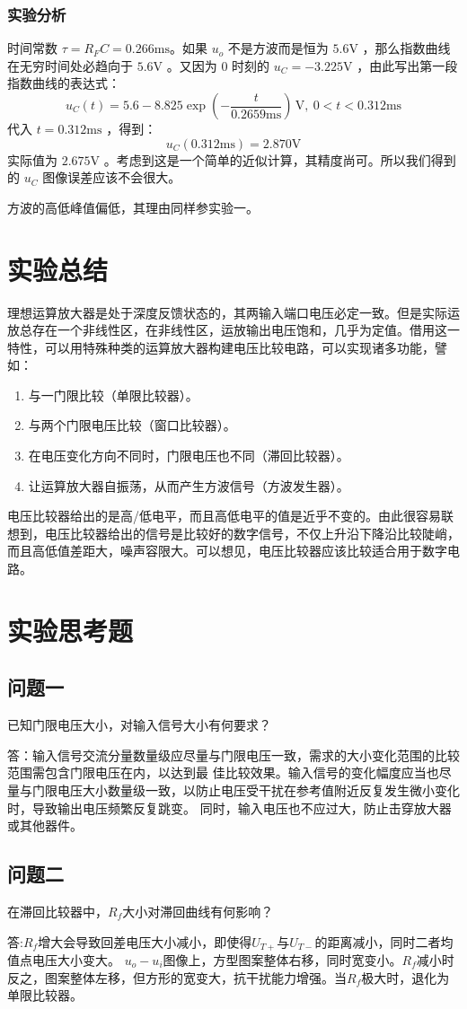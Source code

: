 \documentclass[a4paper,11pt,UTF8]{ctexart}
\newcommand\mr[1]{\mathrm{#1}}
\begin{document}
	\subsubsection{实验分析}
		时间常数 $\tau=R_FC=0.266\mr{ms}$。如果 $u_o$ 不是方波而是恒为 $5.6\mr{V}$ ，那么指数曲线在无穷时间处必趋向于 $5.6\mr{V}$ 。又因为 0 时刻的 $u_C=-3.225\mr{V}$ ，由此写出第一段指数曲线的表达式：
		\[ u_C(t)=5.6-8.825\exp{\left(-\frac{t}{0.2659\mr{ms}}\right)}\,\mr{V},~0<t<0.312\mr{ms} \]
		代入 $t=0.312\mr{ms}$ ，得到：
		\[ u_C(0.312\mr{ms})=2.870\mr{V} \]
		实际值为 $2.675\mr{V}$ 。考虑到这是一个简单的近似计算，其精度尚可。所以我们得到的 $u_C$ 图像误差应该不会很大。
		\par 方波的高低峰值偏低，其理由同样参实验一。
\section{实验总结}
理想运算放大器是处于深度反馈状态的，其两输入端口电压必定一致。但是实际运放总存在一个非线性区，在非线性区，运放输出电压饱和，几乎为定值。借用这一特性，可以用特殊种类的运算放大器构建电压比较电路，可以实现诸多功能，譬如：
\begin{enumerate}
 \item 与一门限比较（单限比较器）。
 \item 与两个门限电压比较（窗口比较器）。
 \item 在电压变化方向不同时，门限电压也不同（滞回比较器）。
 \item 让运算放大器自振荡，从而产生方波信号（方波发生器）。
\end{enumerate}
电压比较器给出的是高/低电平，而且高低电平的值是近乎不变的。由此很容易联想到，电压比较器给出的信号是比较好的数字信号，不仅上升沿下降沿比较陡峭，而且高低值差距大，噪声容限大。可以想见，电压比较器应该比较适合用于数字电路。

\section{实验思考题}
\subsection{问题一}
已知门限电压大小，对输入信号大小有何要求？

答：输入信号交流分量数量级应尽量与门限电压一致，需求的大小变化范围的比较范围需包含门限电压在内，以达到最
佳比较效果。输入信号的变化幅度应当也尽量与门限电压大小数量级一致，以防止电压受干扰在参考值附近反复发生微小变化时，导致输出电压频繁反复跳变。
同时，输入电压也不应过大，防止击穿放大器或其他器件。
\subsection{问题二}
在滞回比较器中，$R_f$大小对滞回曲线有何影响？

答:$R_f$增大会导致回差电压大小减小，即使得$U_{T+}$与$U_{T-}$的距离减小，同时二者均值点电压大小变大。
$u_o-u_i$图像上，方型图案整体右移，同时宽变小。$R_f$减小时反之，图案整体左移，但方形的宽变大，抗干扰能力增强。当$R_f$极大时，退化为单限比较器。
\end{document}
